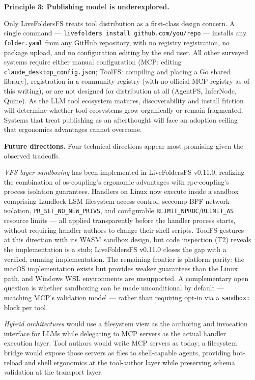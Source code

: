 \documentclass[
  11pt,
]{article}
\begin{document}
\textbf{Principle 3: Publishing model is underexplored.}

Only LiveFoldersFS treats tool distribution as a first-class design
concern. A single command ---
\texttt{livefolders\ install\ github.com/you/repo} --- installs any
\texttt{folder.yaml} from any GitHub repository, with no registry
registration, no package upload, and no configuration editing by the end
user. All other surveyed systems require either manual configuration
(MCP: editing \texttt{claude\_desktop\_config.json}; ToolFS: compiling
and placing a Go shared library), registration in a community registry
(with no official MCP registry as of this writing), or are not designed
for distribution at all (AgentFS, InferNode, Quine). As the LLM tool
ecosystem matures, discoverability and install friction will determine
whether tool ecosystems grow organically or remain fragmented. Systems
that treat publishing as an afterthought will face an adoption ceiling
that ergonomics advantages cannot overcome.

\textbf{Future directions.} Four technical directions appear most
promising given the observed tradeoffs.

\emph{VFS-layer sandboxing} has been implemented in LiveFoldersFS
v0.11.0, realizing the combination of os-coupling's ergonomic advantages
with rpc-coupling's process isolation guarantees. Handlers on Linux now
execute inside a sandbox comprising Landlock LSM filesystem access
control, seccomp-BPF network isolation,
\texttt{PR\_SET\_NO\_NEW\_PRIVS}, and configurable
\texttt{RLIMIT\_NPROC}/\texttt{RLIMIT\_AS} resource limits --- all
applied transparently before the handler process starts, without
requiring handler authors to change their shell scripts. ToolFS gestures
at this direction with its WASM sandbox design, but code inspection (T2)
reveals the implementation is a stub; LiveFoldersFS v0.11.0 closes the
gap with a verified, running implementation. The remaining frontier is
platform parity: the macOS implementation exists but provides weaker
guarantees than the Linux path, and Windows WSL environments are
unsupported. A complementary open question is whether sandboxing can be
made unconditional by default --- matching MCP's validation model ---
rather than requiring opt-in via a \texttt{sandbox:} block per tool.

\emph{Hybrid architectures} would use a filesystem view as the authoring
and invocation interface for LLMs while delegating to MCP servers as the
actual handler execution layer. Tool authors would write MCP servers as
today; a filesystem bridge would expose those servers as files to
shell-capable agents, providing hot-reload and shell ergonomics at the
tool-author layer while preserving schema validation at the transport
layer.
\end{document}
